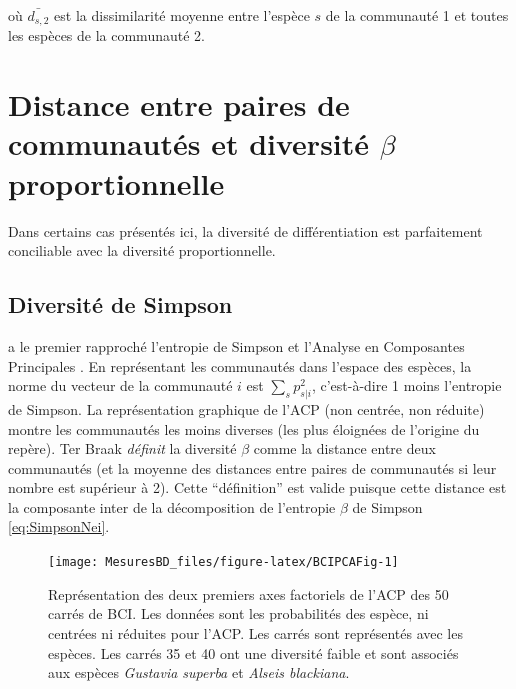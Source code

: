 \documentclass[
  11pt,
  french,
  a4paper,
  extrafontsizes,onecolumn,openright
  ]{memoir}
\newlength{\rf}
\begin{document}
où \(\bar{d_{s,2}}\) est la dissimilarité moyenne entre l'espèce \(s\) de la communauté 1 et toutes les espèces de la communauté 2.

\hypertarget{distance-entre-paires-de-communautuxe9s-et-diversituxe9-beta-proportionnelle}{%
\section{\texorpdfstring{Distance entre paires de communautés et diversité \(\beta\) proportionnelle}{Distance entre paires de communautés et diversité \textbackslash beta proportionnelle}}\label{distance-entre-paires-de-communautuxe9s-et-diversituxe9-beta-proportionnelle}}

Dans certains cas présentés ici, la diversité de différentiation est parfaitement conciliable avec la diversité proportionnelle.

\hypertarget{diversituxe9-de-simpson}{%
\subsection{Diversité de Simpson}\label{diversituxe9-de-simpson}}

\textcite{terBraak1983} a le premier rapproché l'entropie de Simpson et l'Analyse en Composantes Principales \autocite{Pearson1901}.
En représentant les communautés dans l'espace des espèces, la norme du vecteur de la communauté \(i\) est \({\sum_s{p_{s|i}^2}}\), c'est-à-dire 1 moins l'entropie de Simpson.
La représentation graphique de l'ACP (non centrée, non réduite) montre les communautés les moins diverses (les plus éloignées de l'origine du repère).
Ter Braak \emph{définit} la diversité \(\beta\) comme la distance entre deux communautés (et la moyenne des distances entre paires de communautés si leur nombre est supérieur à 2).
Cette \enquote{définition} est valide puisque cette distance est la composante inter de la décomposition de l'entropie \(\beta\) de Simpson \eqref{eq:SimpsonNei}.



\scriptsize

\begin{figure}

{\centering \texttt{[image: MesuresBD\_files/figure-latex/BCIPCAFig-1]} 

}

\caption{Représentation des deux premiers axes factoriels de l'ACP des 50 carrés de BCI. Les données sont les probabilités des espèce, ni centrées ni réduites pour l'ACP. Les carrés sont représentés avec les espèces. Les carrés 35 et 40 ont une diversité faible et sont associés aux espèces \emph{Gustavia superba} et \emph{Alseis blackiana}.}\label{fig:BCIPCAFig}
\end{figure}
\end{document}
